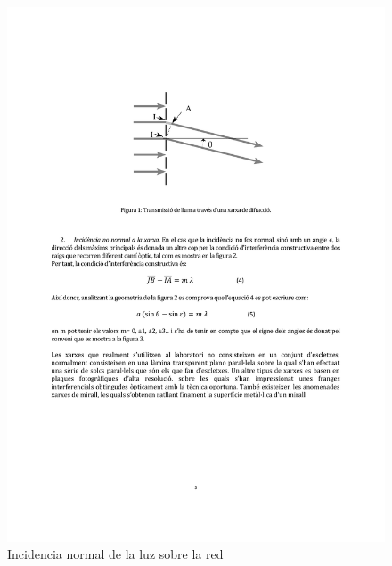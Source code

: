 \documentclass[12pt]{article}
\numberwithin{table}{section}
\numberwithin{figure}{section}
\numberwithin{equation}{section}
\begin{document}
\begin{figure}[htb]
	\centering
	\begin{minipage}{0.45\textwidth}
		\centering
		\includegraphics[scale = 0.7]{incidencia.pdf}
		\caption{Incidencia normal de la luz sobre la red}
		\label{fig:normal}
	\end{minipage}
	\hfill
	\begin{minipage}{0.45\textwidth}
		\centering

\end{minipage}
\end{figure}
\end{document}
